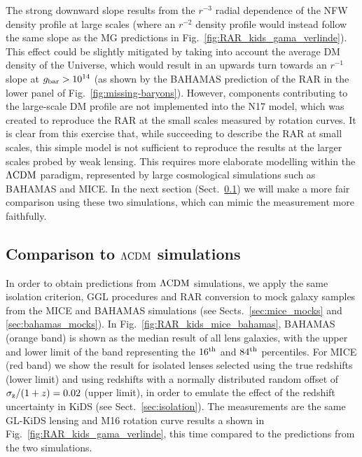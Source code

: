 \documentclass[usenatbib]{mnras}
\newcommand{\lcdm}{{\rm \Lambda CDM}}
\newcommand{\un}[1]{_{\rm #1}}
\begin{document}
The strong downward slope results from the $r^{-3}$ radial dependence of the NFW density profile at large scales (where an $r^{-2}$ density profile would instead follow the same slope as the MG predictions in Fig.~\ref{fig:RAR_kids_gama_verlinde}). This effect could be slightly mitigated by taking into account the average DM density of the Universe, which would result in an upwards turn towards an $r^{-1}$ slope at $g\un{bar}>10^{14}$ (as shown by the BAHAMAS prediction of the RAR in the lower panel of Fig.~\ref{fig:missing-baryons}). However, components contributing to the large-scale DM profile are not implemented into the N17 model, which was created to reproduce the RAR at the small scales measured by rotation curves. It is clear from this exercise that, while succeeding to describe the RAR at small scales, this simple model is not sufficient to reproduce the results at the larger scales probed by weak lensing. This requires more elaborate modelling within the $\lcdm$ paradigm, represented by large cosmological simulations such as BAHAMAS and MICE. In the next section (Sect.~\ref{sec:results-simulations}) we will make a more fair comparison using these two simulations, which can mimic the measurement more faithfully.


\subsection{Comparison to $\lcdm$ simulations}
\label{sec:results-simulations}

In order to obtain predictions from $\lcdm$ simulations, we apply the same isolation criterion, GGL procedures and RAR conversion to mock galaxy samples from the MICE and BAHAMAS simulations (see Sects.~\ref{sec:mice_mocks} and \ref{sec:bahamas_mocks}). In Fig.~\ref{fig:RAR_kids_mice_bahamas}, BAHAMAS (orange band) is shown as the median result of all lens galaxies, with the upper and lower limit of the band representing the $16^{\rm th}$ and $84^{\rm th}$ percentiles. For MICE (red band) we show the result for isolated lenses selected using the true redshifts (lower limit) and using redshifts with a normally distributed random offset of $\sigma\un{z}/(1+z) = 0.02$ (upper limit), in order to emulate the effect of the redshift uncertainty in KiDS (see Sect.~\ref{sec:isolation}). The measurements are the same GL-KiDS lensing and M16 rotation curve results a shown in Fig.~\ref{fig:RAR_kids_gama_verlinde}, this time compared to the predictions from the two simulations.
\end{document}
